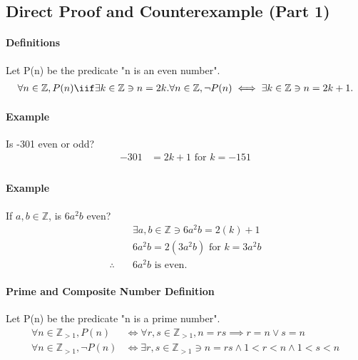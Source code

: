 \subsection{Direct Proof and Counterexample (Part 1)}
\hrulefill

\paragraph*{Definitions}
Let P(n) be the predicate "n is an even number".
\begin{align*}
    \forall n \in \mathbb{Z}, P(n) \iif \exists k \in \mathbb{Z} \ni n = 2k.
    \forall n \in \mathbb{Z}, \neg P(n) \iff \exists k \in \mathbb{Z} \ni n = 2k + 1.
\end{align*}

\paragraph*{Example}
Is -301 even or odd?
\begin{align*}
    -301 &= 2k + 1 \text{ for } k=-151\\
\end{align*}

\paragraph*{Example}
If $a, b \in \mathbb{Z}$, is $6a^2b$ even?
\begin{align*}
    &\exists a, b \in \mathbb{Z} \ni 6a^2b = 2(k) + 1 \\
    &6a^2b = 2(3a^2b) \text{ for } k=3a^2b\\
    \therefore \quad &6a^2b \text{ is even.}
\end{align*}

\paragraph*{Prime and Composite Number Definition}
Let P(n) be the predicate "n is a prime number".
\begin{align*}
    \forall n \in \mathbb{Z}_{>1}, P(n) &\iff \forall r, s \in \mathbb{Z}_{>1}, n=rs \implies r=n \lor s=n\\
    \forall n \in \mathbb{Z}_{>1}, \neg P(n) &\iff \exists r, s \in \mathbb{Z}_{>1} \ni n=rs \land 1 < r < n \land 1 < s < n
\end{align*}

